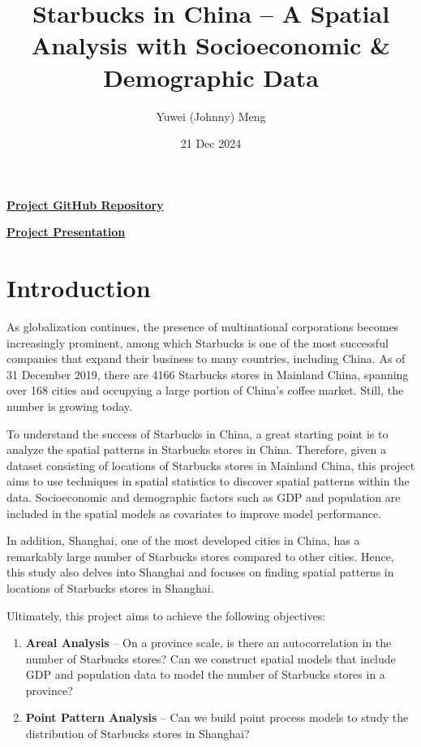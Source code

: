 \documentclass{article}
\title{Starbucks in China -- A Spatial Analysis with Socioeconomic \& Demographic Data}
\author{Yuwei (Johnny) Meng}
\date{21 Dec 2024}
\begin{document}
\pagestyle{fancy}

\maketitle

\thispagestyle{empty}

\href{https://github.com/BullDF/starbucks-in-china}{\textbf{Project GitHub Repository}}

\href{https://play.library.utoronto.ca/watch/c835c3a8158dea3599a85fc1d7a5a2cc}{\textbf{Project Presentation}}

\section{Introduction}

As globalization continues, the presence of multinational corporations becomes increasingly prominent, among which Starbucks is one of the most successful companies that expand their business to many countries, including China. As of 31 December 2019, there are 4166 Starbucks stores in Mainland China, spanning over 168 cities and occupying a large portion of China's coffee market. Still, the number is growing today.

To understand the success of Starbucks in China, a great starting point is to analyze the spatial patterns in Starbucks stores in China. Therefore, given a dataset consisting of locations of Starbucks stores in Mainland China, this project aims to use techniques in spatial statistics to discover spatial patterns within the data. Socioeconomic and demographic factors such as GDP and population are included in the spatial models as covariates to improve model performance.

In addition, Shanghai, one of the most developed cities in China, has a remarkably large number of Starbucks stores compared to other cities. Hence, this study also delves into Shanghai and focuses on finding spatial patterns in locations of Starbucks stores in Shanghai.

Ultimately, this project aims to achieve the following objectives:

\begin{enumerate}
    \item \textbf{Areal Analysis} -- On a province scale, is there an autocorrelation in the number of Starbucks stores? Can we construct spatial models that include GDP and population data to model the number of Starbucks stores in a province?
    \item \textbf{Point Pattern Analysis} -- Can we build point process models to study the distribution of Starbucks stores in Shanghai?
\end{enumerate}
\end{document}
